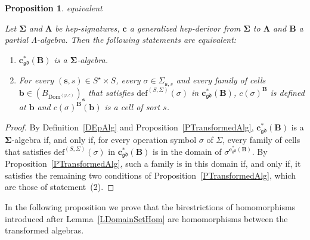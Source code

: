 \documentclass[a4paper, reqno]{amsbook}
\makeatletter
\newcommand{\sig}[1]{\mathbf{#1}}             %
\newcommand{\Dom}{\mathrm{Dom}}
\newcommand{\gd}{\mathfrak{gd}}              %
\theoremstyle{plain}
\newtheorem{proposition}[theorem]{Proposition}
\theoremstyle{definition}
\newcommand*{\CA@leanpending}{}
\newcommand*{\CA@leanrelation}{}
\newcommand*{\lean}[2]{%
  \ifcsname\string\color@lean@#1\endcsname\else
    \PackageError{main}{Unknown relation `#1' in \string\lean}{Use equivalent, weaker or stronger.}%
  \fi
  \gdef\CA@leanrelation{#1}%
  \gdef\CA@leanpending{#2}}
\makeatother
\begin{document}
\begin{proposition}\label{PTransformedEpAlg}\lean{equivalent}{GeneralizedHepDerivor.transformed_isEPAlgebra_iff}
Let $\sig{\Sigma}$ and $\sig{\Lambda}$ be hep-signatures, $\mathbf{c}$ a generalized hep-derivor from $\sig{\Sigma}$ to $\sig{\Lambda}$ and $\mathbf{B}$ a partial $\Lambda$-algebra.
Then the following statements are equivalent:
\begin{enumerate}
\item $\mathbf{c}^{\ast}_{\gd}(\mathbf{B})$ is a $\sig{\Sigma}$-algebra.
\item For every $(\mathbf{s},s)\in S^{\star}\times S$, every $\sigma\in\Sigma_{\mathbf{s},s}$ and every family of cells $\mathbf{b}\in(B_{\Dom^{(\varphi,c)}})_{\mathbf{s}}$ that satisfies $\mathrm{def}^{(S,\Sigma)}(\sigma)$ in $\mathbf{c}^{\ast}_{\gd}(\mathbf{B})$, $c(\sigma)^{\mathbf{B}}$ is defined at $\mathbf{b}$ and $c(\sigma)^{\mathbf{B}}(\mathbf{b})$ is a cell of sort $s$.
\end{enumerate}
\end{proposition}
\begin{proof}
By Definition~\ref{DEpAlg} and Proposition~\ref{PTransformedAlg}, $\mathbf{c}^{\ast}_{\gd}(\mathbf{B})$ is a $\sig{\Sigma}$-algebra if, and only if, for every operation symbol $\sigma$ of $\Sigma$, every family of cells that satisfies $\mathrm{def}^{(S,\Sigma)}(\sigma)$ in $\mathbf{c}^{\ast}_{\gd}(\mathbf{B})$ is in the domain of $\sigma^{\mathbf{c}^{\ast}_{\gd}(\mathbf{B})}$.
By Proposition~\ref{PTransformedAlg}, such a family is in this domain if, and only if, it satisfies the remaining two conditions of Proposition~\ref{PTransformedAlg}, which are those of statement~(2).
\end{proof}

In the following proposition we prove that the birestrictions of homomorphisms introduced after Lemma~\ref{LDomainSetHom} are homomorphisms between the transformed algebras.
\end{document}
